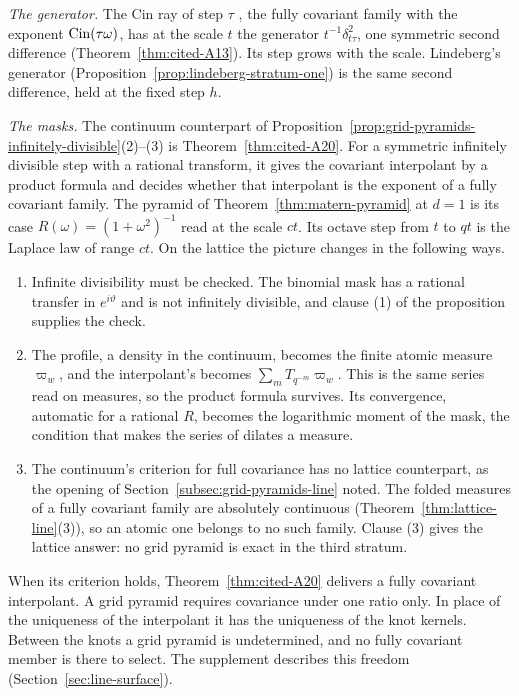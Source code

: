 \emph{The generator.} The Cin ray of step $\tau$ , the fully
covariant family with the exponent $\operatorname{Cin}(\tau\omega)$, has at the scale $t$ the generator
$t^{-1}\delta^2_{t\tau}$, one symmetric second difference (Theorem~\ref{thm:cited-A13}). Its step
grows with the scale. Lindeberg's generator (Proposition~\ref{prop:lindeberg-stratum-one}) is the
same second difference, held at the fixed step $h$.

\emph{The masks.} The continuum counterpart of
Proposition~\ref{prop:grid-pyramids-infinitely-divisible}(2)--(3) is Theorem~\ref{thm:cited-A20}.
For a symmetric infinitely divisible step with a rational transform, it gives the covariant interpolant by a
product formula and decides whether that interpolant is the exponent of a fully covariant family.
The \Matern{} pyramid of Theorem~\ref{thm:matern-pyramid} at $d = 1$ is its case
$R(\omega) = (1 + \omega^2)^{-1}$ read at the scale $ct$. Its octave step from $t$ to $qt$ is the
Laplace law of range $ct$. On the lattice the picture changes in the following ways.
\begin{enumerate}
\item Infinite divisibility must be checked. The binomial mask has a rational transfer in
$e^{i\vartheta}$ and is not infinitely divisible, and clause (1) of the proposition supplies the
check.
\item The profile, a density in the continuum, becomes the finite atomic measure $\varpi_w$, and the
interpolant's becomes $\sum_mT_{q^{-m}}\varpi_w$. This is the same series read on measures, so the
product formula survives. Its convergence, automatic for a rational $R$, becomes the logarithmic
moment of the mask, the condition that makes the series of dilates a \Levy{} measure.
\item The continuum's criterion for full covariance has no lattice counterpart, as the opening of
Section~\ref{subsec:grid-pyramids-line} noted. The folded \Levy{} measures of a fully covariant
family are absolutely continuous (Theorem~\ref{thm:lattice-line}(3)), so an atomic one belongs to
no such family. Clause (3) gives the lattice answer: no grid pyramid is exact in the third stratum.
\end{enumerate}
When its criterion holds, Theorem~\ref{thm:cited-A20} delivers a fully covariant interpolant. A
grid pyramid requires covariance under one ratio only. In place of the uniqueness of the interpolant it has the uniqueness of the
knot kernels. Between the knots a grid pyramid is undetermined, and no fully covariant member is
there to select. The supplement describes this freedom (Section~\ref{sec:line-surface}).
